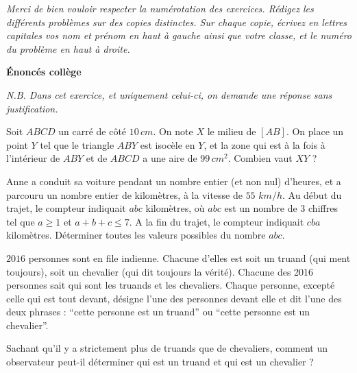 \begin{itemize}




\end{itemize}

\pagebreak




\emph {Merci de bien vouloir respecter la num\'erotation des exercices. R\'edigez les diff\'erents probl\`emes sur des copies distinctes. Sur chaque copie, \'ecrivez en lettres capitales
vos nom et pr\'enom en haut \`a gauche ainsi que votre classe, et le num\'ero du probl\`eme en haut \`a droite.}

\bigskip
{\bf\large \'Enonc\'es coll\`ege}
\par\medskip



\begin{exo}
\emph{N.B. Dans cet exercice, et uniquement celui-ci, on demande une r\'eponse sans justification.}

Soit $ABCD$ un carr\'e de c\^ot\'e $10 \, cm$. On note $X$ le milieu de $[AB]$. On place un point $Y$ tel que le triangle $ABY$ est isoc\`ele en $Y$, et la zone qui est \`a la fois \`a l'int\'erieur de $ABY$ et de $ABCD$ a une aire de $99 \, cm^2$. Combien vaut $XY$ ?
\end{exo}

\begin{exo}
Anne a conduit sa voiture pendant un nombre entier (et non nul) d'heures, et a parcouru un nombre entier de kilom\`etres, \`a la
vitesse de $55$ $km/h$. Au d\'ebut du trajet, le compteur indiquait $abc$ kilom\`etres, o\`u $abc$ est un nombre de $3$ chiffres
tel que $a\geqslant 1$ et $a+b+c\leqslant 7$. A la fin du trajet, le compteur indiquait $cba$ kilom\`etres. D\'eterminer toutes les valeurs possibles
du nombre $abc$.
\end{exo}

\begin{exo}
$2016$ personnes sont en file indienne. Chacune d'elles est soit un truand (qui ment toujours), soit un chevalier (qui dit toujours la v\'erit\'e).
Chacune des 2016 personnes sait qui sont les truands et les chevaliers.
Chaque personne, except\'e celle qui est tout devant, d\'esigne l'une des personnes devant elle et dit l'une des deux phrases : ``cette personne est un truand'' ou ``cette personne est un chevalier''.

Sachant qu'il y a strictement plus de truands que de chevaliers, comment un observateur peut-il d\'eterminer qui est un truand et qui est un chevalier ?
\end{exo}




